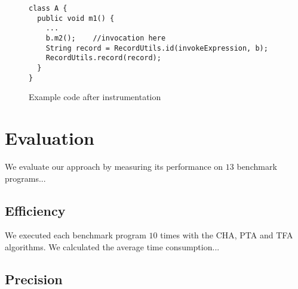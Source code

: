 \documentclass{fac}
\begin{document}
\begin{figure}
\begin{lstlisting}
class A {
  public void m1() {
    ...
    b.m2();    //invocation here
    String record = RecordUtils.id(invokeExpression, b);
    RecordUtils.record(record);
  }
}
\end{lstlisting}
\caption{Example code after instrumentation}
\label{fig:after-instru}
\end{figure}



\section{Evaluation}\label{sec:evaluation}
We evaluate our approach by measuring its performance on $13$ benchmark programs...
\subsection{Efficiency}\label{subsec:efficiency}
We executed each benchmark program $10$ times with the CHA, PTA and TFA algorithms. We calculated the average time consumption...
\subsection{Precision}\label{subsec:precision}
\end{document}

